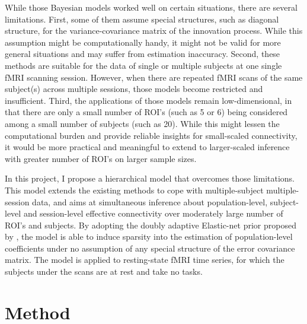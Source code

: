 \documentclass[12pt]{elsarticle}
\begin{document}
	
	While those Bayesian models worked well on certain situations, there are several limitations. 
	First, some of them assume special structures, such as diagonal structure, for the variance-covariance matrix of the innovation process. 
	While this assumption might be computationally handy, it might not be valid for more general situations and may suffer from estimation inaccuracy.
	Second, these methods are suitable for the data of single or multiple subjects at one single fMRI scanning session. 
	However, when there are repeated fMRI scans of the same subject(s) across multiple sessions, those models become restricted and insufficient.
	Third, the applications of those models remain low-dimensional, in that there are only a small number of ROI's (such as 5 or 6) being considered among a small number of subjects (such as 20).
	While this might lessen the computational burden and provide reliable insights for small-scaled connectivity, it would be more practical and meaningful to extend to larger-scaled inference with greater number of ROI's on larger sample sizes.
	
	
	In this project, I propose a hierarchical model that overcomes those limitations. 
	This model extends the existing methods to cope with multiple-subject multiple-session data, and aims at simultaneous inference about population-level, subject-level and session-level effective connectivity over moderately large number of ROI's and subjects. 
	By adopting the doubly adaptive Elastic-net prior proposed by \cite{Gefang}, the model is able to induce sparsity into the estimation of population-level coefficients under no assumption of any special structure of the error covariance matrix.
	The model is applied to resting-state fMRI time series, for which the subjects under the scans are at rest and take no tasks.
	
	
	
	\section{Method}
	
\end{document}
